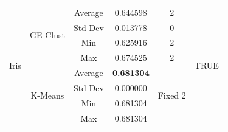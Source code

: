 \documentclass[conference,compsoc]{IEEEtran}
\begin{document}
\begin{table}[]
\begin{tabular}{|c|c|c|c|c|c|}
		\multirow{8}{*}{Iris}                  & \multirow{4}{*}{GE-Clust}           & Average                        & 0.644598                   & 2                        & \multirow{8}{*}{TRUE} \\ \cline{3-5}
		&                               & Std Dev                        & 0.013778                   & 0                        &                       \\ \cline{3-5}
		&                               & Min                            & 0.625916                   & 2                        &                       \\ \cline{3-5}
		&                               & Max                            & 0.674525                   & 2                        &                       \\ \cline{2-5}
		& \multirow{4}{*}{K-Means}      & Average                        & \textbf{0.681304}                   & \multirow{4}{*}{Fixed 2} &                       \\ \cline{3-4}
		&                               & Std Dev                        & 0.000000                   &                          &                       \\ \cline{3-4}
		&                               & Min                            & 0.681304                   &                          &                       \\ \cline{3-4}
		&                               & Max                            & 0.681304                   &                          &                       \\ \cline{3-4}							\hline
	\end{tabular}
\end{table}
\end{document}
